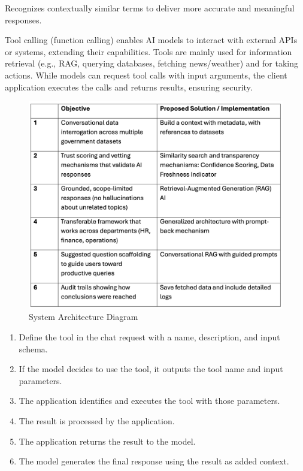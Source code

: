 
Recognizes contextually similar terms to deliver more accurate and meaningful responses.


Tool calling (function calling) enables AI models to interact with external APIs or systems, extending their capabilities. Tools are mainly used for information retrieval (e.g., RAG, querying databases, fetching news/weather) and for taking actions. While models can request tool calls with input arguments, the client application executes the calls and returns results, ensuring security.

\begin{figure}[h]
    \centering
    \includegraphics[width=0.85\linewidth]{img/images2}
    \caption{System Architecture Diagram}
\end{figure}

\begin{enumerate}

\item Define the tool in the chat request with a name, description, and input schema.

\item If the model decides to use the tool, it outputs the tool name and input parameters.

\item The application identifies and executes the tool with those parameters.

\item The result is processed by the application.

\item The application returns the result to the model.

\item The model generates the final response using the result as added context.

\end{enumerate}

